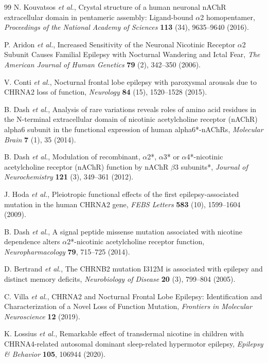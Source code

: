 \documentclass{ws-procs11x85}
\begin{document}
\begin{thebibliography}{99}
N. Kouvatsos {\em et al.}, Crystal structure of a human neuronal nAChR extracellular domain in pentameric assembly: Ligand-bound $\alpha$2 homopentamer, {\em Proceedings of the National Academy of Sciences} {\bf 113} (34), 9635--9640 (2016).

P. Aridon {\em et al.}, Increased Sensitivity of the Neuronal Nicotinic Receptor $\alpha$2 Subunit Causes Familial Epilepsy with Nocturnal Wandering and Ictal Fear, {\em The American Journal of Human Genetics} {\bf 79} (2), 342--350 (2006).

V. Conti {\em et al.}, Nocturnal frontal lobe epilepsy with paroxysmal arousals due to CHRNA2 loss of function, {\em Neurology} {\bf 84} (15), 1520--1528 (2015).

B. Dash {\em et al.}, Analysis of rare variations reveals roles of amino acid residues in the N-terminal extracellular domain of nicotinic acetylcholine receptor (nAChR) alpha6 subunit in the functional expression of human alpha6*-nAChRs, {\em Molecular Brain} {\bf 7} (1), 35 (2014).

B. Dash {\em et al.}, Modulation of recombinant, $\alpha$2*, $\alpha$3* or $\alpha$4*-nicotinic acetylcholine receptor (nAChR) function by nAChR $\beta$3 subunits*, {\em Journal of Neurochemistry} {\bf 121} (3), 349--361 (2012).

J. Hoda {\em et al.}, Pleiotropic functional effects of the first epilepsy-associated mutation in the human CHRNA2 gene, {\em FEBS Letters} {\bf 583} (10), 1599--1604 (2009).

B. Dash {\em et al.}, A signal peptide missense mutation associated with nicotine dependence alters $\alpha$2*-nicotinic acetylcholine receptor function, {\em Neuropharmacology} {\bf 79}, 715--725 (2014).

D. Bertrand {\em et al.}, The CHRNB2 mutation I312M is associated with epilepsy and distinct memory deficits, {\em Neurobiology of Disease} {\bf 20} (3), 799--804 (2005).

C. Villa {\em et al.}, CHRNA2 and Nocturnal Frontal Lobe Epilepsy: Identification and Characterization of a Novel Loss of Function Mutation, {\em Frontiers in Molecular Neuroscience} {\bf 12} (2019).

K. Lossius {\em et al.}, Remarkable effect of transdermal nicotine in children with CHRNA4-related autosomal dominant sleep-related hypermotor epilepsy, {\em Epilepsy \& Behavior} {\bf 105}, 106944 (2020).


\end{thebibliography}
\end{document}
